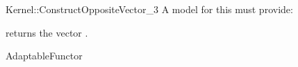 \begin{ccRefFunctionObjectConcept}{Kernel::ConstructOppositeVector_3}
A model for this must provide:


{returns the vector .}

\ccRefines
AdaptableFunctor

\ccSeeAlso
{}  \\

\end{ccRefFunctionObjectConcept}
